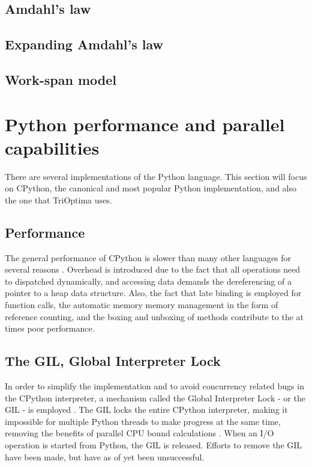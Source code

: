 \subsection{Amdahl's law}
\subsection{Expanding Amdahl's law}
\subsection{Work-span model}

\section{Python performance and parallel capabilities}
There are several implementations of the Python language. This section will focus on CPython, the canonical and most popular Python implementation, and also the one that TriOptima uses.

\subsection{Performance}
The general performance of CPython is slower than many other languages for several
reasons \cite{barany_2014_python_pipd}. Overhead is introduced due to the fact that all operations need to dispatched dynamically,
and accessing data demands the dereferencing of a pointer to a heap data structure. Also, the fact that late binding is employed
for function calls, the automatic memory memory management in the form of reference counting, and the boxing and unboxing of
methods contribute to the at times poor performance.

\subsection{The GIL, Global Interpreter Lock}
In order to simplify the implementation and to avoid concurrency related bugs in the CPython interpreter,
a mechanism called the Global Interpreter Lock - or the GIL - is employed  \cite{palach_2014_parallel_ppwp}.
The GIL locks the entire CPython interpreter, making it impossible for multiple Python threads to make progress at
the same time, removing the benefits of parallel CPU bound calculations
\cite{glossary_gp2d}. When an I/O operation is started from Python, the GIL is released.
Efforts to remove the GIL have been made, but have as of yet been unsuccessful.

